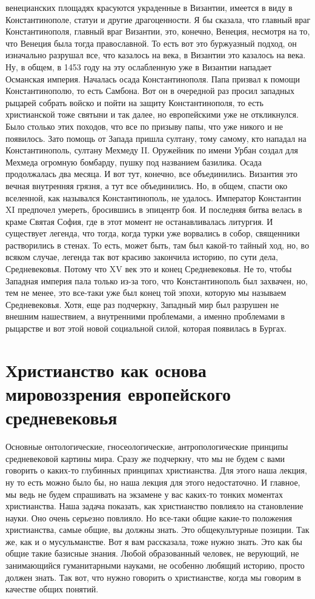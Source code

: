 венецианских площадях красуются украденные в Византии, имеется в виду в
Константинополе, статуи и другие драгоценности. Я бы сказала, что главный враг
Константинополя, главный враг Византии, это, конечно, Венеция, несмотря на то,
что Венеция была тогда православной. То есть вот это буржуазный подход, он
изначально разрушал все, что казалось на века, в Византии это казалось на века.
Ну, в общем, в 1453 году на эту ослабленную уже в Византии нападает Османская
империя. Началась осада Константинополя. Папа призвал к помощи Константинополю,
то есть Самбона. Вот он в очередной раз просил западных рыцарей собрать войско и
пойти на защиту Константинополя, то есть христианской тоже святыни и так далее,
но европейскими уже не откликнулся. Было столько этих походов, что все по
призыву папы, что уже никого и не появилось. Зато помощь от Запада пришла
султану, тому самому, кто нападал на Константинополь, султану Мехмеду II.
Оружейник по имени Урбан создал для Мехмеда огромную бомбарду, пушку под
названием базилика. Осада продолжалась два месяца. И вот тут, конечно, все
объединились. Византия это вечная внутренняя грязня, а тут все объединились. Но,
в общем, спасти око вселенной, как назывался Константинополь, не удалось.
Император Константин XI предпочел умереть, бросившись в эпицентр боя. И
последняя битва велась в краме Святая София, где в этот момент не
останавливалась литургия. И существует легенда, что тогда, когда турки уже
ворвались в собор, священники растворились в стенах. То есть, может быть, там
был какой-то тайный ход, но, во всяком случае, легенда так вот красиво закончила
историю, по сути дела, Средневековья. Потому что XV век это и конец
Средневековья. Не то, чтобы Западная империя пала только из-за того, что
Константинополь был захвачен, но, тем не менее, это все-таки уже был конец той
эпохи, которую мы называем Средневековья. Хотя, еще раз подчеркну, Западный мир
был разрушен не внешним нашествием, а внутренними проблемами, а именно
проблемами в рыцарстве и вот этой новой социальной силой, которая появилась в
Бургах. 

\section{Христианство как основа мировоззрения европейского средневековья}

Основные онтологические, гносеологические, антропологические принципы средневековой
картины мира. Сразу же подчеркну, что мы не будем с вами говорить о каких-то
глубинных принципах христианства. Для этого наша лекция, ну то есть можно было
бы, но наша лекция для этого недостаточно. И главное, мы ведь не будем
спрашивать на экзамене у вас каких-то тонких моментах христианства. Наша задача
показать, как христианство повлияло на становление науки. Оно очень серьезно
повлияло. Но все-таки общие какие-то положения христианства, самые общие, вы
должны знать. Это общекультурные позиции. Так же, как и о мусульманстве. Вот я
вам рассказала, тоже нужно знать. Это как бы общие такие базисные знания. Любой
образованный человек, не верующий, не занимающийся гуманитарными науками, не
особенно любящий историю, просто должен знать. Так вот, что нужно говорить о
христианстве, когда мы говорим в качестве общих понятий. 

